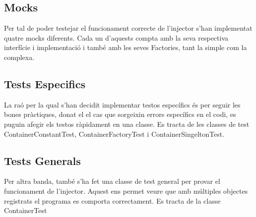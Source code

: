
\subsection{Mocks}
Per tal de poder testejar el funcionament correcte de l'injector s'han implementat quatre mocks diferents. Cada un d'aquests compta amb la seva respectiva interfície i implementació i també amb les seves Factories, tant la simple com la complexa.
\subsection{Tests Especifics}
La raó per la qual s'han decidit implementar testos específics és per seguir les bones pràctiques, donat el el cas que sorgeixin errors específics en el codi, es puguin afegir els testos ràpidament en una classe. Es tracta de les classes de test ContainerConstantTest, ContainerFactoryTest i ContainerSingeltonTest.
\subsection{Tests Generals}
Per altra banda, també s'ha fet una classe de test general per provar el funcionament de l'injector. Aquest ens permet veure que amb múltiples objectes registrats el programa es comporta correctament. Es tracta de la classe ContainerTest
